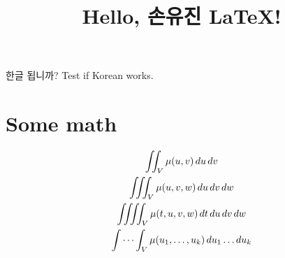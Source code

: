 \documentclass[12pt]{article}
\begin{document}
\title{Hello, 손유진 \LaTeX!}
\maketitle

한글 됩니까? Test if Korean works.

\section{Some math}
\begin{gather*}
    \iint_V \mu(u,v) \,du\,dv
\\
    \iiint_V \mu(u,v,w) \,du\,dv\,dw
\\
    \iiiint_V \mu(t,u,v,w) \,dt\,du\,dv\,dw
\\
    \idotsint_V \mu(u_1,\dots,u_k) \,du_1 \dots du_k
\end{gather*}
\end{document}
